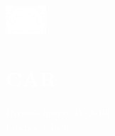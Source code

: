 \documentclass[../main.tex]{subfiles}
\begin{document}
\hspace*{0.2cm}
    \begin{minipage}[t]{2cm}
        \vspace*{0.9cm}\includegraphics[width=1.5cm]{assets/car.png}
    \end{minipage}
    \begin{minipage}[t]{5cm}
    
        \vspace*{0.75cm}
        \section*{\textcolor{white}{CAR}}
        \vspace*{-0.25cm}
        \textcolor{white}{
            Driver's license B [2019] \\
            I own a vehicle
        }
    \end{minipage}
\end{document}
